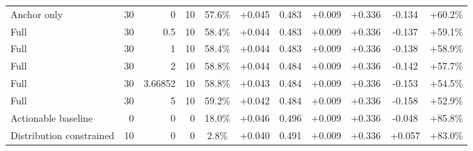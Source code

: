 \begin{table}[htbp]
\begin{tabular}{lrrrccccccc}
Anchor only & 30 & 0 & 10 & 57.6\% & +0.045 & 0.483 & +0.009 & +0.336 & -0.134 & +60.2\% \\
Full & 30 & 0.5 & 10 & 58.4\% & +0.044 & 0.483 & +0.009 & +0.336 & -0.137 & +59.1\% \\
Full & 30 & 1 & 10 & 58.4\% & +0.044 & 0.483 & +0.009 & +0.336 & -0.138 & +58.9\% \\
Full & 30 & 2 & 10 & 58.8\% & +0.044 & 0.484 & +0.009 & +0.336 & -0.142 & +57.7\% \\
Full & 30 & 3.66852 & 10 & 58.8\% & +0.043 & 0.484 & +0.009 & +0.336 & -0.153 & +54.5\% \\
Full & 30 & 5 & 10 & 59.2\% & +0.042 & 0.484 & +0.009 & +0.336 & -0.158 & +52.9\% \\
Actionable baseline & 0 & 0 & 0 & 18.0\% & +0.046 & 0.496 & +0.009 & +0.336 & -0.048 & +85.8\% \\
Distribution constrained & 10 & 0 & 0 & 2.8\% & +0.040 & 0.491 & +0.009 & +0.336 & +0.057 & +83.0\% \\
\bottomrule
\end{tabular}
\end{table}